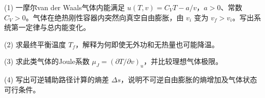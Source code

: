 (1) 一摩尔van der Waals气体内能满足 \(u(T,v)=C_VT-a/v\)，\(a>0\)、常数 \(C_V>0\)。气体在绝热刚性容器内突然向真空自由膨胀，由 \(v_i\) 变为 \(v_f>v_i\)。写出系统第一定律与总内能变化。

(2) 求最终平衡温度 \(T_f\)，解释为何即使无外功和无热量也可能降温。

(3) 求此类气体的Joule系数 \(\mu_J=(\partial T/\partial v)_u\)，并比较理想气体极限。

(4) 写出可逆辅助路径计算的熵差 \(\Delta s\)，说明不可逆自由膨胀的熵增加及气体状态可行条件。

